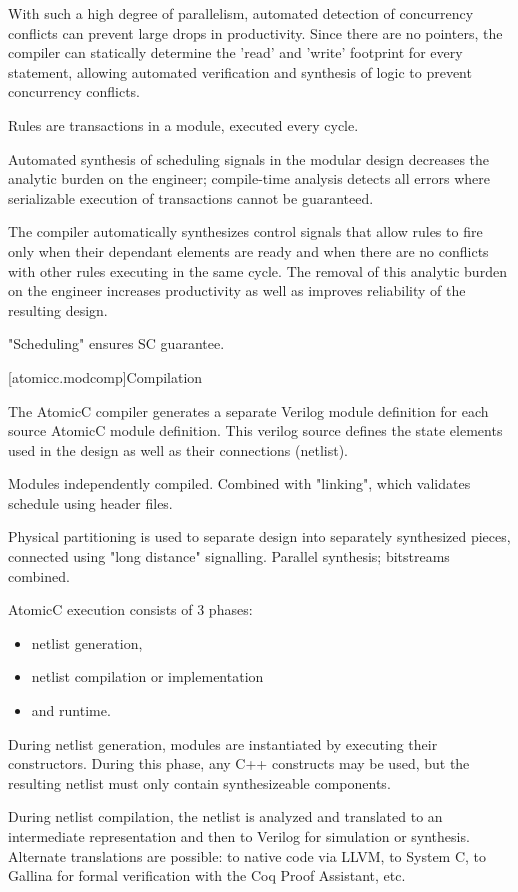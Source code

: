 With such a high degree of parallelism, automated detection of concurrency
conflicts can prevent large drops in productivity.
Since there are no pointers, the compiler can statically determine the 'read' and 'write'
footprint for every statement, allowing automated verification and
synthesis of logic to prevent concurrency conflicts.

Rules are transactions in a module, executed every cycle.

Automated synthesis of scheduling signals in the modular design
decreases the analytic burden on the engineer; compile-time analysis
detects all errors where serializable execution of transactions cannot be guaranteed.

The compiler automatically synthesizes control signals that allow rules to fire
only when their dependant elements are ready and when there are no conflicts with
other rules executing in the same cycle.  The removal of this analytic burden on
the engineer increases productivity as well as improves reliability of the
resulting design.

"Scheduling" ensures SC guarantee.

[atomicc.modcomp]{Compilation}

The AtomicC compiler generates a separate Verilog module definition
for each source AtomicC module definition.
This verilog source defines the state elements
used in the design as well as their connections (netlist).

Modules independently compiled.  Combined with "linking", which validates schedule using header files.

Physical partitioning is used to separate design into separately synthesized pieces, connected using
"long distance" signalling.  Parallel synthesis; bitstreams combined.

AtomicC execution consists of 3 phases:
\begin{itemize}
\item netlist generation, 
\item netlist compilation or implementation
\item and runtime.
\end{itemize}

During netlist
generation, modules are instantiated by executing their
constructors. During this phase, any C++ constructs may be used, but
the resulting netlist must only contain synthesizeable components.

During netlist compilation, the netlist is analyzed and translated to
an intermediate representation and then to Verilog for simulation or
synthesis. Alternate translations are possible: to native code via
LLVM, to System C, to Gallina for formal verification with the Coq
Proof Assistant, etc.

